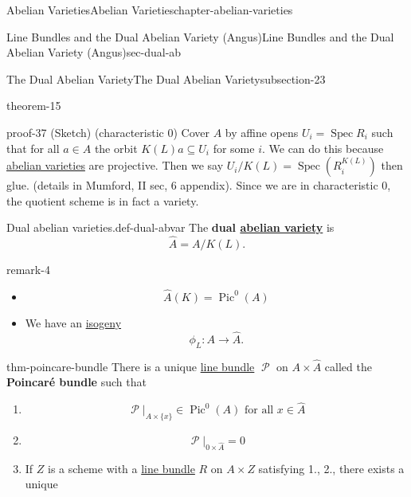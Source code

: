 \documentclass[oneside,10pt,]{book}
\newcommand{\terminology}[1]{\textbf{#1}}
\numberwithin{equation}{section}
\newcommand{\sheaf}[1]{\operatorname{\mathcal{#1}}}
\DeclareMathOperator{\Pic}{Pic}
\DeclareMathOperator{\Spec}{Spec}
\begin{document}
\begin{chapterptx}{Abelian Varieties}{}{Abelian Varieties}{}{}{chapter-abelian-varieties}
\begin{sectionptx}{Line Bundles and the Dual Abelian Variety (Angus)}{}{Line Bundles and the Dual Abelian Variety (Angus)}{}{}{sec-dual-ab}
\begin{subsectionptx}{The Dual Abelian Variety}{}{The Dual Abelian Variety}{}{}{subsection-23}
\begin{theorem}{}{}{theorem-15}
\end{theorem}
\begin{proofptx}{}{proof-37}
\hypertarget{p-191}{}%
(Sketch) (characteristic 0) Cover \(A\) by affine opens \(U_i = \Spec R_i\) such that for all \(a \in A\) the orbit \(K(L)a \subseteq U_i\) for some \(i\). We can do this because \hyperref[def-buntes-abvar]{abelian varieties} are projective. Then we say \(U_i / K(L) = \Spec(R^{K(L)}_i)\) then glue. (details in Mumford, II sec, 6  appendix). Since we are in characteristic 0, the quotient scheme is in fact a variety.%
\end{proofptx}
\begin{definition}{Dual abelian varieties.}{def-dual-abvar}%
\hypertarget{p-192}{}%
The \terminology{dual \hyperref[def-buntes-abvar]{abelian variety}} is%
\begin{equation*}
\hat A = A/K(L)\text{.}
\end{equation*}
%
\end{definition}
\begin{remark}{}{remark-4}%
\hypertarget{p-193}{}%
\leavevmode%
\begin{itemize}[label=\textbullet]
\item{}%
\begin{equation*}
\hat A(K) = \Pic^0(A)
\end{equation*}
%
\item{}We have an \hyperref[def-supersing-isog-isog]{isogeny}%
\begin{equation*}
\phi_L\colon A \to \hat A\text{.}
\end{equation*}
%
\end{itemize}
%
\end{remark}
\begin{theorem}{}{}{thm-poincare-bundle}%
\hypertarget{p-194}{}%
There is a unique \hyperref[def-line-bundle]{line bundle} \(\sheaf P\) on \(A\times \hat A\) called the \terminology{Poincaré bundle} such that\leavevmode%
\begin{enumerate}
\item\hypertarget{li-35}{}%
\begin{equation*}
\sheaf P|_{A\times \{x\}} \in \Pic^0(A) \text{ for all }x\in \hat A
\end{equation*}
%
\item\hypertarget{li-36}{}%
\begin{equation*}
\sheaf P|_{0\times \hat A} = 0
\end{equation*}
%
\item\hypertarget{li-37}{}If \(Z\) is a  scheme with a \hyperref[def-line-bundle]{line bundle} \(R\) on \(A\times Z\) satisfying 1., 2., there exists a unique%

\end{enumerate}
\end{theorem}
\end{subsectionptx}
\end{sectionptx}
\end{chapterptx}
\end{document}
